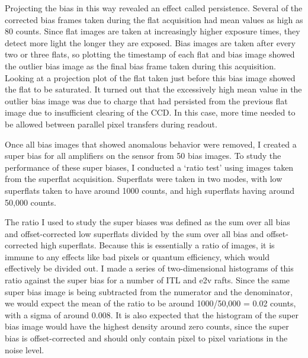Projecting the bias in this way revealed an effect called persistence. Several of the corrected bias frames taken during the flat acquisition had mean values as high as 80 counts. Since flat images are taken at increasingly higher exposure times, they detect more light the longer they are exposed. Bias images are taken after every two or three flats, so plotting the timestamp of each flat and bias image showed the outlier bias image as the final bias frame taken during this acquisition. Looking at a projection plot of the flat taken just before this bias image showed the flat to be saturated. It turned out that the excessively high mean value in the outlier bias image was due to charge that had persisted from the previous flat image due to insufficient clearing of the CCD. In this case, more time needed to be allowed between parallel pixel transfers during readout. 

Once all bias images that showed anomalous behavior were removed, I created a super bias for all amplifiers on the sensor from 50 bias images. To study the performance of these super biases, I conducted a ‘ratio test’ using images taken from the superflat acquisition. Superflats were taken in two modes, with low superflats taken to have around 1000 counts, and high superflats having around 50,000 counts. 

The ratio I used to study the super biases was defined as the sum over all bias and offset-corrected low superflats divided by the sum over all bias and offset-corrected high superflats. Because this is essentially a ratio of images, it is immune to any effects like bad pixels or quantum efficiency, which would effectively be divided out. I made a series of two-dimensional histograms of this ratio against the super bias for a number of ITL and e2v rafts. Since the same super bias image is being subtracted from the numerator and the denominator, we would expect the mean of the ratio to be around 1000/50,000 = 0.02 counts, with a sigma of around 0.008. It is also expected that the histogram of the super bias image would have the highest density around zero counts, since the super bias is offset-corrected and should only contain pixel to pixel variations in the noise level. 

